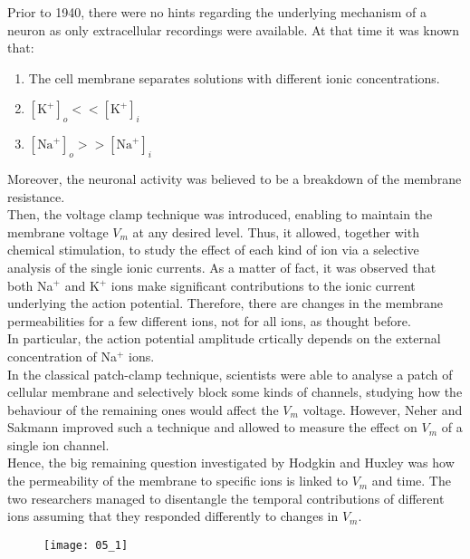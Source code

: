 Prior to 1940, there were no hints regarding the underlying mechanism of a neuron
as only extracellular recordings were available. At that time it was known that:
\begin{enumerate}
    \item The cell membrane separates solutions with different ionic concentrations.
    \item \([\text{K}^{+}]_{o}<<[\text{K}^{+}]_{i}\)
    \item \([\text{Na}^{+}]_{o}>>[\text{Na}^{+}]_{i}\)
\end{enumerate}
Moreover, the neuronal activity was believed to be a breakdown of the membrane resistance.\\
Then, the voltage clamp technique was introduced, enabling to maintain the membrane
voltage \(V_{m}\) at any desired level. Thus, it allowed, together with chemical stimulation,
to study the effect of each kind of ion via a selective analysis of the single ionic currents.
As a matter of fact, it was observed that both Na\({}^{+}\) and K\({}^{+}\) ions make significant
contributions to the ionic current underlying the action potential. Therefore, there are changes
in the membrane permeabilities for a few different ions, not for all ions, as thought before.\\
In particular, the action potential amplitude crtically depends on the external concentration of
Na\({}^{+}\) ions.\\
In the classical patch-clamp technique, scientists were able to analyse a patch of cellular membrane
and selectively block some kinds of channels, studying how the behaviour of the remaining ones would
affect the \(V_{m}\) voltage. However, Neher and Sakmann improved such a technique and allowed to
measure the effect on \(V_{m}\) of a single ion channel.\\
Hence, the big remaining question investigated by Hodgkin and Huxley was how the permeability of the
membrane to specific ions is linked to \(V_{m}\) and time. The two researchers managed to
disentangle the temporal contributions of different ions assuming that they responded
differently to changes in \(V_{m}\).
\begin{figure}[H]
    \texttt{[image: 05\_1]}
    \centering
\end{figure}

